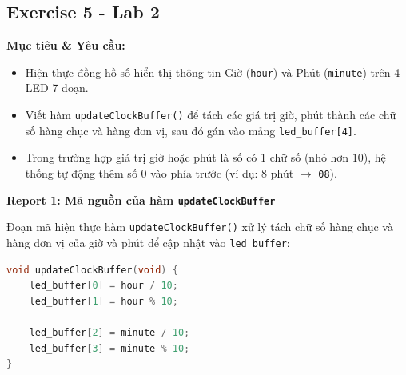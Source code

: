 \subsection{Exercise 5 - Lab 2}

\textbf{Mục tiêu \& Yêu cầu:}
\begin{itemize}
    \item Hiện thực đồng hồ số hiển thị thông tin Giờ (\texttt{hour}) và Phút (\texttt{minute}) trên 4 LED 7 đoạn.
    \item Viết hàm \texttt{updateClockBuffer()} để tách các giá trị giờ, phút thành các chữ số hàng chục và hàng đơn vị, sau đó gán vào mảng \texttt{led\_buffer[4]}.
    \item Trong trường hợp giá trị giờ hoặc phút là số có 1 chữ số (nhỏ hơn $10$), hệ thống tự động thêm số $0$ vào phía trước (ví dụ: $8$ phút $\rightarrow$ \texttt{08}).
\end{itemize}

\vspace{0.3cm}

\textbf{Report 1: Mã nguồn của hàm \texttt{updateClockBuffer}}

Đoạn mã hiện thực hàm \texttt{updateClockBuffer()} xử lý tách chữ số hàng chục và hàng đơn vị của giờ và phút để cập nhật vào \texttt{led\_buffer}:

\begin{lstlisting}[language=C, caption={Hàm updateClockBuffer tách chữ số giờ và phút vào led\_buffer}, label={lst:lab2_ex5_updatebuffer}]
void updateClockBuffer(void) {
    led_buffer[0] = hour / 10;
    led_buffer[1] = hour % 10;

    led_buffer[2] = minute / 10;
    led_buffer[3] = minute % 10;
}
\end{lstlisting}